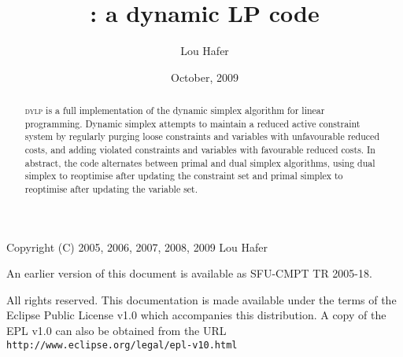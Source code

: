 \documentclass[titlepage]{article}
\title{\bfseries \dylp: a dynamic LP code}
\author{Lou Hafer}
\date{October, 2009}
\newcommand{\dylp}{\textsc{dylp}\xspace}
\begin{document}
\maketitle

\thispagestyle{empty}
\vspace*{\fill}

\noindent
Copyright (C) 2005, 2006, 2007, 2008, 2009 Lou Hafer

\noindent
An earlier version of this document is available as SFU-CMPT TR 2005-18.

\noindent
All rights reserved. This documentation is made available under the terms of
the Eclipse Public License v1.0 which accompanies this distribution.
A copy of the EPL v1.0 can also be obtained from the URL
\texttt{http://www.eclipse.org/legal/epl-v10.html}

\begin{abstract}\noindent
\dylp is a full implementation of the dynamic simplex algorithm for
linear programming.
Dynamic simplex attempts to maintain a reduced active constraint system
by regularly
purging loose constraints and variables with unfavourable reduced costs, and
adding violated constraints and variables with favourable reduced costs.
In abstract, the code alternates between primal and dual simplex algorithms,
using dual simplex to reoptimise after updating the constraint set and primal
simplex to reoptimise after updating the variable set.
\end{abstract}

\tableofcontents

\pagebreak

\listoffigures
\listoftables























\end{document}
